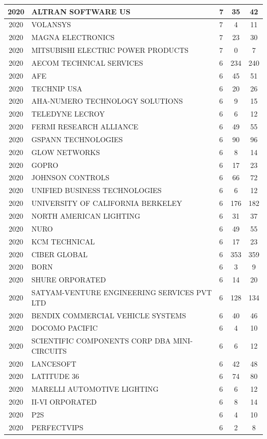 \documentclass{article}%
\begin{document}
\begin{longtable}{c|p{20em}|p{5em}|c|c}
2020&ALTRAN SOFTWARE US&7&35&42\\%
\hline%
2020&VOLANSYS&7&4&11\\%
\hline%
2020&MAGNA ELECTRONICS&7&23&30\\%
\hline%
2020&MITSUBISHI ELECTRIC POWER PRODUCTS&7&0&7\\%
\hline%
2020&AECOM TECHNICAL SERVICES&6&234&240\\%
\hline%
2020&AFE&6&45&51\\%
\hline%
2020&TECHNIP USA&6&20&26\\%
\hline%
2020&AHA{-}NUMERO TECHNOLOGY SOLUTIONS&6&9&15\\%
\hline%
2020&TELEDYNE LECROY&6&6&12\\%
\hline%
2020&FERMI RESEARCH ALLIANCE&6&49&55\\%
\hline%
2020&GSPANN TECHNOLOGIES&6&90&96\\%
\hline%
2020&GLOW NETWORKS&6&8&14\\%
\hline%
2020&GOPRO&6&17&23\\%
\hline%
2020&JOHNSON CONTROLS&6&66&72\\%
\hline%
2020&UNIFIED BUSINESS TECHNOLOGIES&6&6&12\\%
\hline%
2020&UNIVERSITY OF CALIFORNIA BERKELEY&6&176&182\\%
\hline%
2020&NORTH AMERICAN LIGHTING&6&31&37\\%
\hline%
2020&NURO&6&49&55\\%
\hline%
2020&KCM TECHNICAL&6&17&23\\%
\hline%
2020&CIBER GLOBAL&6&353&359\\%
\hline%
2020&BORN&6&3&9\\%
\hline%
2020&SHURE ORPORATED&6&14&20\\%
\hline%
2020&SATYAM{-}VENTURE ENGINEERING SERVICES PVT LTD&6&128&134\\%
\hline%
2020&BENDIX COMMERCIAL VEHICLE SYSTEMS&6&40&46\\%
\hline%
2020&DOCOMO PACIFIC&6&4&10\\%
\hline%
2020&SCIENTIFIC COMPONENTS CORP DBA MINI{-}CIRCUITS&6&6&12\\%
\hline%
2020&LANCESOFT&6&42&48\\%
\hline%
2020&LATITUDE 36&6&74&80\\%
\hline%
2020&MARELLI AUTOMOTIVE LIGHTING&6&6&12\\%
\hline%
2020&II{-}VI ORPORATED&6&8&14\\%
\hline%
2020&P2S&6&4&10\\%
\hline%
2020&PERFECTVIPS&6&2&8\\%

\end{longtable}
\end{document}
